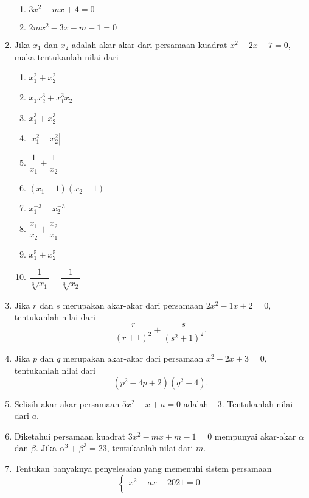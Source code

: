 \begin{enumerate}[nosep]
\begin{multcols}
\begin{enumerate}
					\item $ 3x^{2} - mx + 4 = 0 $
					\item $ 2mx^{2} - 3x - m - 1 = 0 $
				\end{enumerate}
			\end{multcols}
			\item Jika $ x_{1} $ dan $ x_{2} $ adalah akar-akar dari persamaan kuadrat $ x^{2} - 2x + 7 = 0 $, maka tentukanlah nilai dari
			\begin{multcols}
				\begin{enumerate}
					\item $ x_{1}^{2} + x_{2}^{2} $
					\item $ x_{1}x_{2}^{3} + x_{1}^{3}x_{2} $
					\item $ x_{1}^{3} + x_{2}^{3} $
					\item $ \left|x_{1}^{2} - x_{2}^{2}\right| $
					\item $ \dfrac{1}{x_{1}} + \dfrac{1}{x_{2}} $
					\item $ \left(x_{1} - 1\right)\left(x_{2} + 1\right) $
					\item $ x_{1}^{-3} - x_{2}^{-3} $
					\item $ \dfrac{x_{1}}{x_{2}} + \dfrac{x_{2}}{x_{1}} $
					\item $ x_{1}^{5} + x_{2}^{5} $
					\item $ \dfrac{1}{\sqrt[3]{x_{1}}} + \dfrac{1}{\sqrt[3]{x_{2}}} $
				\end{enumerate}
			\end{multcols}
			\item Jika $ r $ dan $ s $ merupakan akar-akar dari persamaan $ 2x^{2} - 1x + 2 = 0 $, tentukanlah nilai dari
			\[ \frac{r}{\left(r + 1\right)^{2}} + \frac{s}{\left(s^{2} + 1\right)^{2}}. \]
			\item Jika $ p $ dan $ q $ merupakan akar-akar dari persamaan $ x^{2} - 2x + 3 = 0 $, tentukanlah nilai dari
			\[ \left(p^{2} - 4p + 2\right)\left(q^{2} + 4\right). \]
			\item Selisih akar-akar persamaan $ 5x^{2} - x + a = 0 $ adalah $ -3 $. Tentukanlah nilai dari $ a $.
			\item Diketahui persamaan kuadrat $ 3x^{2} - mx + m - 1 = 0 $ mempunyai akar-akar $ \alpha $ dan $ \beta $. Jika $ \alpha^{3} + \beta^{3} = 23 $, tentukanlah nilai dari $ m $.
			\item Tentukan banyaknya penyelesaian yang memenuhi sistem persamaan
			\[
				\begin{cases}
					x^{2} - ax + 2021 = 0 \\

\end{cases}\]
\end{enumerate}

